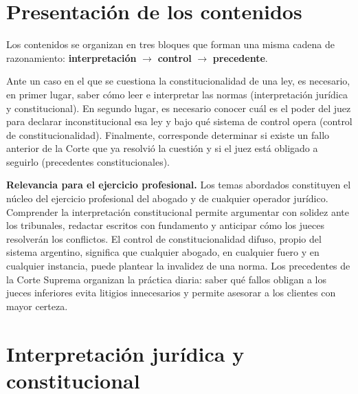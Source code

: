 \documentclass[12pt,oneside]{book}
\begin{document}
\tableofcontents

\chapter*{Presentación de los contenidos}

Los contenidos se organizan en tres bloques que forman una misma cadena de razonamiento: \textbf{interpretación} $\rightarrow$ \textbf{control} $\rightarrow$ \textbf{precedente}.

Ante un caso en el que se cuestiona la constitucionalidad de una ley, es necesario, en primer lugar, saber cómo leer e interpretar las normas (interpretación jurídica y constitucional). En segundo lugar, es necesario conocer cuál es el poder del juez para declarar inconstitucional esa ley y bajo qué sistema de control opera (control de constitucionalidad). Finalmente, corresponde determinar si existe un fallo anterior de la Corte que ya resolvió la cuestión y si el juez está obligado a seguirlo (precedentes constitucionales).

\begin{note}
\textbf{Relevancia para el ejercicio profesional.} Los temas abordados constituyen el núcleo del ejercicio profesional del abogado y de cualquier operador jurídico. Comprender la interpretación constitucional permite argumentar con solidez ante los tribunales, redactar escritos con fundamento y anticipar cómo los jueces resolverán los conflictos. El control de constitucionalidad difuso, propio del sistema argentino, significa que cualquier abogado, en cualquier fuero y en cualquier instancia, puede plantear la invalidez de una norma. Los precedentes de la Corte Suprema organizan la práctica diaria: saber qué fallos obligan a los jueces inferiores evita litigios innecesarios y permite asesorar a los clientes con mayor certeza.
\end{note}

\chapter{Interpretación jurídica y constitucional}
\end{document}
